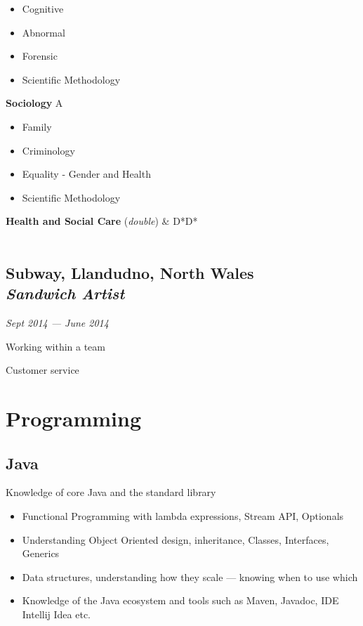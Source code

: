\documentclass[a4paper, 13pt, draft]{article}
\newcommand{\timeperiod}[2]{%
    \textit{\small{#1 --- #2}}
}
\newcommand{\proglang}[1]{%
    \subsection*{#1}
}
\begin{document}
\begin{multicols}{2}
    \begin{itemize}		
	\setlength\itemsep{0em}
    \item Cognitive
    \item Abnormal
    \item Forensic
    \item Scientific Methodology 
\end{itemize}		

\textbf{Sociology} A

\begin{itemize}		
    \setlength\itemsep{0em}
\item Family
\item Criminology
\item Equality - Gender and Health
\item Scientific Methodology
\end{itemize}		

\textbf{Health and Social Care} (\textit{double}) & D*D* \\ \\

\end{multicols}

\subsection*{Subway, \small{Llandudno, North Wales} \\\emph{Sandwich Artist}} \timeperiod{Sept 2014}{June 2014}

\begin{itemize}		
    \begin{multicols}{3}
    \item Working within a team
    \item Customer service
    \end{multicols}
\end{itemize}		

\section*{\color{col1} \Large{Programming} \color{default}} 

\proglang{Java}

Knowledge of core Java and the standard library

\begin{itemize}
    \setlength\itemsep{0em}
\item
    Functional Programming with lambda expressions, Stream API, Optionals
\item
    Understanding Object Oriented design, inheritance, Classes,
    Interfaces, Generics
\item
    Data structures, understanding how they scale --- knowing when to use which
\item
    Knowledge of the Java ecosystem and tools such as Maven, Javadoc, IDE
    Intellij Idea etc. 
\end{itemize}
\end{document}

